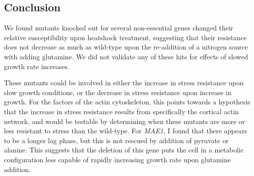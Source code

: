 
\subsection{Conclusion}

We found mutants knocked out for several non-essential genes changed
their relative susceptibility upon heatshock treatment, suggesting
that their resistance does not decrease as much as wild-type upon the
re-addition of a nitrogen source with adding glutamine.
We did not validate any of these hits for effects of slowed growth
rate increases.

These mutants could be involved in either the increase in stress
resistance upon slow growth conditions, or the decrease in stress
resistance upon increase in growth. 
For the factors of the actin cytoskeleton, this points towards a
hypothesis that the increase in stress resistance results from
specifically the cortical actin network, and would be testable by
determining when these mutants are more or less resistant to stress
than the wild-type. For \textit{MAE1}, I found that there appears to
be a longer lag phase, but this is not rescued by addition of pyruvate
or alanine. This suggests that the deletion of this gene puts the cell
in a metabolic configuration less capable of rapidly increasing growth
rate upon glutamine addition.

\iffalse
%
%
%
\section{Apparent cell-cycle halt upon nitrogen-upshift}
%
%
%

Apparent cell-cycle halt upon
glutamine addition Previous work on cell cycle halt, basically just
alberghina, PKA and CLN1 This phenomenon has been previously seen.
Upshift ecoli, they get bigger.  This is thought to be because the
critical cell size threshold has been reset by growth signalling
pathways to a larger size. However, this result might argue that
instead it could be regulated by CLN1 transcript abundance.
Alberghina’s demonstrated that depends on Swi4?p, so there you go


Experiment, results Conclusion ( anything that didn’t get into chapter
3 )
\fi
